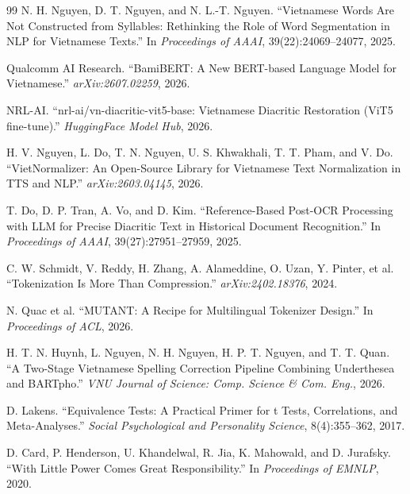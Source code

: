 \documentclass[12pt,a4paper]{article}
\begin{document}
\begin{thebibliography}{99}
N. H. Nguyen, D. T. Nguyen, and N. L.-T. Nguyen.
\newblock ``Vietnamese Words Are Not Constructed from Syllables: Rethinking the Role of Word Segmentation in NLP for Vietnamese Texts.''
\newblock In \emph{Proceedings of AAAI}, 39(22):24069--24077, 2025.

Qualcomm AI Research.
\newblock ``BamiBERT: A New BERT-based Language Model for Vietnamese.''
\newblock \emph{arXiv:2607.02259}, 2026.

NRL-AI.
\newblock ``nrl-ai/vn-diacritic-vit5-base: Vietnamese Diacritic Restoration (ViT5 fine-tune).''
\newblock \emph{HuggingFace Model Hub}, 2026.

H. V. Nguyen, L. Do, T. N. Nguyen, U. S. Khwakhali, T. T. Pham, and V. Do.
\newblock ``VietNormalizer: An Open-Source Library for Vietnamese Text Normalization in TTS and NLP.''
\newblock \emph{arXiv:2603.04145}, 2026.

T. Do, D. P. Tran, A. Vo, and D. Kim.
\newblock ``Reference-Based Post-OCR Processing with LLM for Precise Diacritic Text in Historical Document Recognition.''
\newblock In \emph{Proceedings of AAAI}, 39(27):27951--27959, 2025.

C. W. Schmidt, V. Reddy, H. Zhang, A. Alameddine, O. Uzan, Y. Pinter, et al.
\newblock ``Tokenization Is More Than Compression.''
\newblock \emph{arXiv:2402.18376}, 2024.

N. Quac et al.
\newblock ``MUTANT: A Recipe for Multilingual Tokenizer Design.''
\newblock In \emph{Proceedings of ACL}, 2026.

H. T. N. Huynh, L. Nguyen, N. H. Nguyen, H. P. T. Nguyen, and T. T. Quan.
\newblock ``A Two-Stage Vietnamese Spelling Correction Pipeline Combining Underthesea and BARTpho.''
\newblock \emph{VNU Journal of Science: Comp. Science \& Com. Eng.}, 2026.

D. Lakens.
\newblock ``Equivalence Tests: A Practical Primer for t Tests, Correlations, and Meta-Analyses.''
\newblock \emph{Social Psychological and Personality Science}, 8(4):355--362, 2017.

D. Card, P. Henderson, U. Khandelwal, R. Jia, K. Mahowald, and D. Jurafsky.
\newblock ``With Little Power Comes Great Responsibility.''
\newblock In \emph{Proceedings of EMNLP}, 2020.

\end{thebibliography}
\end{document}
